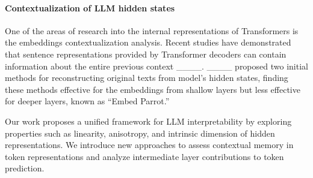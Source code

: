 \paragraph{Contextualization of LLM hidden states}

One of the areas of research into the internal representations of Transformers is the embeddings contextualization analysis. Recent studies have demonstrated that sentence representations provided by Transformer decoders can contain information about the entire previous context ____. ____ proposed two initial methods for reconstructing original texts from model’s hidden states, finding these methods effective for the embeddings from shallow layers but less effective for deeper layers, known as ``Embed Parrot.''


Our work proposes a unified framework for LLM interpretability by exploring properties such as linearity, anisotropy, and intrinsic dimension of hidden representations. We introduce new approaches to assess contextual memory in token representations and analyze intermediate layer contributions to token prediction.